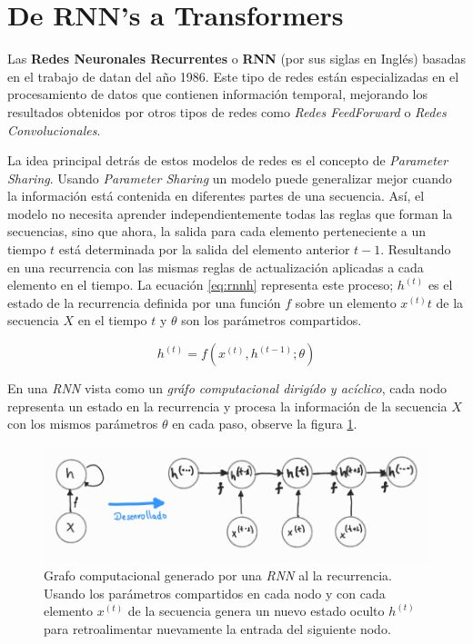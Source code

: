 \section{De RNN's a Transformers}

Las \textbf{Redes Neuronales Recurrentes} o \textbf{RNN} (por sus siglas en Inglés) basadas en el
trabajo de \citeauthor*{Rumelhart} datan del año 1986. Este tipo de redes están especializadas
en el procesamiento de datos que contienen información temporal, mejorando los resultados obtenidos
por otros tipos de redes como \textit{Redes FeedForward} o \textit{Redes Convolucionales}.

La idea principal detrás de estos modelos de redes es el concepto de \textit{Parameter Sharing}.
Usando \textit{Parameter Sharing} un modelo puede generalizar mejor cuando la información
está contenida en diferentes partes de una secuencia. Así, el modelo no necesita aprender
independientemente todas las reglas que forman la secuencias, sino que ahora, la salida para cada
elemento perteneciente a un tiempo $t$ está determinada por la salida del elemento anterior $t-1$.
Resultando en una recurrencia con las mismas reglas de actualización aplicadas a cada elemento en el tiempo.
La ecuación \ref{eq:rnnh} representa este proceso; $h^{(t)}$ es el estado de la recurrencia definida
por una función $f$ sobre un elemento $x^{(t)}t$ de la secuencia $X$ en el tiempo $t$ y $\theta$ son
los parámetros compartidos.

\begin{equation}
    h^{(t)} = f(x^{(t)}, h^{(t-1)}; \theta)
    \label{eq:rnnh}
\end{equation}

En una \textit{RNN} vista como un \textit{gráfo computacional dirigído y acíclico}, cada nodo
representa un estado en la recurrencia y procesa la información de la secuencia $X$ con los mismos
parámetros $\theta$ en cada paso, observe la figura \ref{fig:rnn_cg}.

\begin{figure}[!ht]
\centering
\includegraphics[width=.8\textwidth]{Chapters/2. Transformer/Figures/rnn/rnn_cgraph.png}
\caption[RNN - Grafo Computacional]{Grafo computacional generado por una \textit{RNN} al
         la recurrencia. Usando los parámetros compartidos en cada nodo
        y con cada elemento $x^{(t)}$ de la secuencia genera un nuevo estado oculto $h^{(t)}$
        para retroalimentar nuevamente la entrada del siguiente nodo.}
\label{fig:rnn_cg}
\end{figure}

